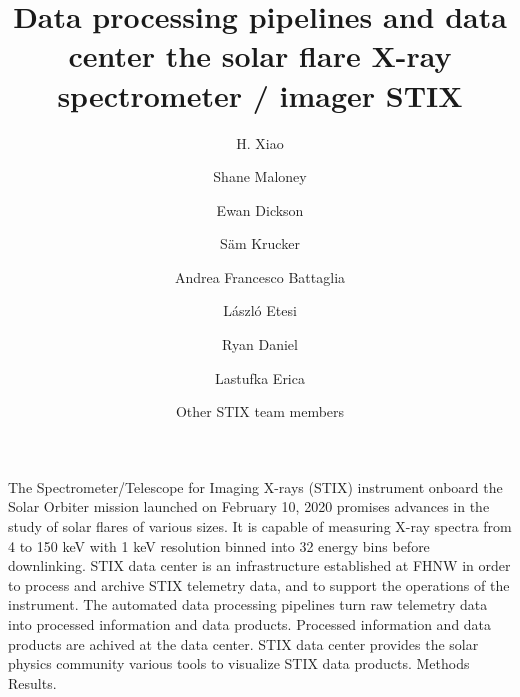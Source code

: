 \documentclass{aa}
\begin{document}
 


   \title{Data processing pipelines and data center the solar flare X-ray spectrometer / imager STIX}

   \subtitle{}

   \author{H. Xiao
          \and 
          Shane Maloney 
          \and 
          Ewan Dickson 
          \and 
          S\"am Krucker
          \and Andrea Francesco Battaglia
            \and László Etesi 
          \and Ryan Daniel 
          \and Lastufka Erica 
          \and Other STIX team members
         }


   \date{}

 
  \abstract
   {} %
   { The Spectrometer/Telescope for Imaging X-rays (STIX) instrument onboard the Solar Orbiter mission launched on February 10, 2020 promises advances in the study of solar flares of various sizes. It is capable of measuring X-ray spectra from 4 to 150 keV with 1 keV resolution binned into 32 energy bins before downlinking. STIX data center is an infrastructure established at FHNW in order to process and archive STIX telemetry data, and to support the operations of the instrument. The automated data processing pipelines turn raw telemetry data into processed information and data products. Processed information and data products are achived at the data center.  STIX data center provides the solar physics community various tools to visualize STIX data products.
   }
   {Methods}
   {Results.}
   {}

\end{document}
